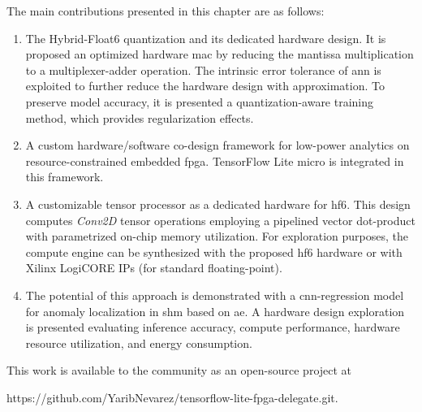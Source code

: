 The main contributions presented in this chapter are as follows:
\begin{enumerate}
	\item
	
	The Hybrid-Float6 quantization and its dedicated hardware design. It is proposed an optimized hardware \gls{mac} by reducing the mantissa multiplication to a multiplexer-adder operation. The intrinsic error tolerance of \gls{ann} is exploited to further reduce the hardware design with approximation. To preserve model accuracy, it is presented a quantization-aware training method, which provides regularization effects.
	
	\item A custom hardware/software co-design framework for low-power analytics on resource-constrained embedded \gls{fpga}. TensorFlow Lite micro is integrated in this framework.
	\item A customizable tensor processor as a dedicated hardware for \gls{hf6}. This design computes \emph{Conv2D} tensor operations employing a pipelined vector dot-product with parametrized on-chip memory utilization. For exploration purposes, the compute engine can be synthesized with the proposed \gls{hf6} hardware or with Xilinx LogiCORE IPs (for standard floating-point).
	\item The potential of this approach is demonstrated with a \gls{cnn}-regression model for anomaly localization in \gls{shm} based on \gls{ae}. A hardware design exploration is presented evaluating inference accuracy, compute performance, hardware resource utilization, and energy consumption.
\end{enumerate}

This work is available to the community as an open-source project at

https://github.com/YaribNevarez/tensorflow-lite-fpga-delegate.git.